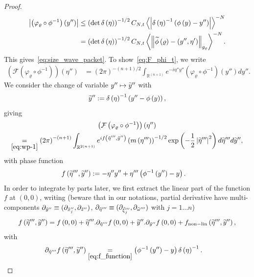 \documentclass[AHL,Unicode,longabstracts,published]{cedram}
\newcommand{\clF}{\mathcal{F}}
\newcommand{\nonlin}{\mathrm{non-lin}}
\newcommand{\bbR}{\mathbb{R}}
\let\oldtilde\tilde
\renewcommand*{\tilde}[1]{\mathchoice{\widetilde{#1}}{\widetilde{#1}}{\oldtilde{#1}}{\oldtilde{#1}}}
\newcommand{\bbR}{\mathbb{R}}
\begin{document}
\begin{proof}
\begin{align*}
\left|\left(\varphi_{\varrho}\circ\phi^{-1}\right)\left(y''\right)\right| & \leq\left(\det \delta\left(\eta\right)\right)^{-1/2}C_{N,t}\left\langle \left|\delta\left(\eta\right)^{-1}\left(\phi\left(y\right)-y''\right)\right|\right\rangle ^{-N}\\
& =\left(\det \delta\left(\eta\right)\right)^{-1/2}C_{N,t}\left\langle \left\Vert \tilde{\phi}\left(\varrho\right)-\left(y'',\eta'\right)\right\Vert _{g_{\varrho}}\right\rangle ^{-N}.
\end{align*}
This gives~\eqref{eq:size_wave_packet}. To show~\eqref{eq:F_phi_t}, we write
\begin{align*}
\left(\clF\left(\varphi_{\varrho}\circ\phi^{-1}\right)\right)\left(\eta''\right) & =\left(2\pi\right)^{-\left(n+1\right)/2}\int_{\bbR^{\left(n+1\right)}}e^{-i\eta''y''}\left(\varphi_{\varrho}\circ\phi^{-1}\right)\left(y''\right)dy''.
\end{align*}
We consider the change of variable $y''\mapsto\tilde{y}''$ with
\[
\tilde{y}'':=\delta\left(\eta\right)^{-1}\left(y''-\phi\left(y\right)\right),
\]
giving
\begin{multline*}
\left(\clF\left(\varphi_{\varrho}\circ\phi^{-1}\right)\right)\left(\eta''\right)\\
\underset{\eqref{eq:wp-1}}{=}\left(2\pi\right)^{-\left(n+1\right)}\int_{\bbR^{2\left(n+1\right)}}e^{if\left(\tilde{\eta}''',\tilde{y}''\right)}\left(m\left(\eta'''\right)\right)^{-1/2}\exp\left(-\frac{1}{2}\left|\tilde{\eta}'''\right|^{2}\right)d\tilde{\eta}'''d\tilde{y}'',
\end{multline*}
with phase function
\begin{align}
f\left(\tilde{\eta}''',\tilde{y}''\right) & :=-\eta''y''+\eta'''\left(\phi^{-1}\left(y''\right)-y\right).\label{eq:f_function}
\end{align}
In order to integrate by parts later, we first extract the linear part of the function $f$ at $(0,0)$, writing (beware that in our notations, partial derivative have multi-components $\partial_{\tilde{y}''}\equiv(\partial_{\tilde{x}_{j}''},\partial_{\tilde{z}''})$, $\partial_{\tilde{\eta}'''}\equiv(\partial_{\tilde{\xi}_{j}'''},\partial_{\tilde{\omega}'''})$ with $j=1\ldots n$)
\[
f\left(\tilde{\eta}''',\tilde{y}''\right)=f\left(0,0\right)+\tilde{\eta}'''.\partial_{\tilde{\eta}'''}f\left(0,0\right)+\tilde{y}''.\partial_{\tilde{y}''}f\left(0,0\right)+f_{\nonlin}\left(\tilde{\eta}''',\tilde{y}''\right),
\]
with
\begin{align*}
\partial_{\tilde{\eta}'''}f\left(\tilde{\eta}''',\tilde{y}''\right) &\underset{\eqref{eq:f_function}}{=}\left(\phi^{-1}\left(y''\right)-y\right)\delta\left(\eta\right)^{-1}.

\end{align*}
\end{proof}
\end{document}
